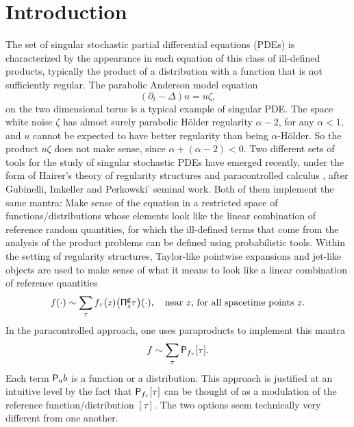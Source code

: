 \section{Introduction}
\label{SectionIntro}

The set of singular stochastic partial differential equations (PDEs) is characterized by the appearance in each equation of this class of ill-defined products, typically the product of a distribution with a function that is not sufficiently regular. The parabolic Anderson model equation
\[
(\partial_t-\Delta) u = u\zeta,
\]
on the two dimensional torus is a typical example of singular PDE. The space white noise $\zeta$ has almost surely parabolic Hölder regularity $\alpha-2$, for any $\alpha<1$, and $u$ cannot be expected to have better regularity than being $\alpha$-Hölder. So the product $u\zeta$ does not make sense, since $\alpha+(\alpha-2)<0$. Two different sets of tools for the study of singular stochastic PDEs have emerged recently, under the form of Hairer's theory of regularity structures \cite{Hai, BHZ, CH16, BCCH18} and paracontrolled calculus \cite{GIP, BBF15, BB16}, after Gubinelli, Imkeller and Perkowski' seminal work. Both of them implement the same mantra: Make sense of the equation in a restricted space of functions/distributions whose elements look like the linear combination of reference random quantities, for which the ill-defined terms that come from the analysis of the product problems can be defined using probabilistic tools. Within the setting of regularity structures, Taylor-like pointwise expansions and jet-like objects are used to make sense of what it means to look like a linear combination of reference quantities
\[
f (\cdot) \sim \sum_\tau f_\tau(z)\bigl({\sf \Pi}^{\sf g}_z\tau\bigr)(\cdot), \quad \textrm{near $z$, for all spacetime points $z$}.
\]
In the paracontrolled approach, one uses paraproducts to implement this mantra
\[
f \sim \sum_\tau {\sf P}_{f_\tau}[\tau].
\]
Each term ${\sf P}_ab$ is a function or a distribution. This approach is justified at an intuitive level by the fact that ${\sf P}_{f_\tau}[\tau]$ can be thought of as a modulation of the reference function/distribution $[\tau]$. The two options seem technically very different from one another.

